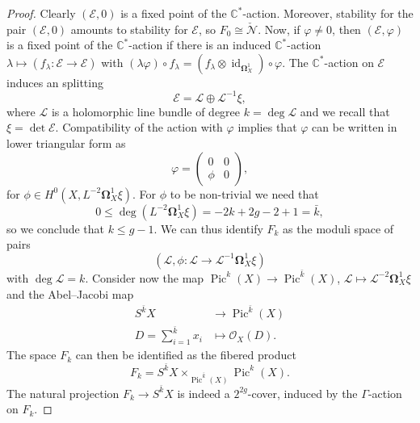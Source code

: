 \documentclass[12pt,a4paper]{amsbook}
\theoremstyle{remark} \newtheorem{rmk}[thm]{Remark}
\theoremstyle{definition} \newtheorem{defn}[thm]{Definition}
\theoremstyle{definition} \newtheorem{ex}[thm]{Example}
\theoremstyle{definition} \newtheorem{ej}{Exercise}
\newcommand{\C}{\mathbb C}
\newcommand{\cN}{\mathcal N}
\newcommand{\sO}{\mathscr O}
\newcommand{\sE}{\mathscr E}
\newcommand{\sL}{\mathscr L}
\DeclareMathOperator{\Pic}{Pic}
\DeclareMathOperator{\id}{id}
\begin{document}
\begin{proof}
  Clearly $(\sE,0)$ is a fixed point of the $\C^*$-action. Moreover, stability for the pair $(\sE,0)$ amounts to stability for $\sE$, so $F_0\cong \check{\cN}$. Now, if $\varphi \neq 0$, then $(\sE,\varphi)$ is a fixed point of the $\C^*$-action if there is an induced $\C^*$-action $\lambda \mapsto (f_\lambda: \sE \rightarrow \sE)$ with $(\lambda \varphi) \circ f_\lambda = (f_\lambda \otimes \id_{\bm{\Omega}^1_X}) \circ \varphi$. The $\C^*$-action on $\sE$ induces an splitting
  \begin{equation*}
\sE = \sL \oplus \sL^{-1} \xi,
  \end{equation*}
  where $\sL$ is a holomorphic line bundle of degree $k=\deg \sL$ and we recall that $\xi=\det \sE$. Compatibility of the action with $\varphi$ implies that $\varphi$ can be written in lower triangular form as
  \begin{equation*}
    \varphi =
    \begin{pmatrix}
      0 & 0 \\
      \phi & 0
    \end{pmatrix},
  \end{equation*}
  for $\phi \in H^0(X,L^{-2}\bm{\Omega}^1_X \xi)$. For $\phi$ to be non-trivial we need that
  \begin{equation*}
0 \leq \deg (L^{-2}\bm{\Omega}^1_X \xi) =-2k + 2g-2 + 1= \bar{k},
  \end{equation*}
  so we conclude that $k \leq g -1$. We can thus identify $F_k$ as the moduli space of pairs
  \begin{equation*}
(\sL,\phi: \sL \rightarrow \sL^{-1} \bm{\Omega}^1_X \xi)
  \end{equation*}
  with $\deg \sL = k$. Consider now the map $\Pic^{k}(X)\rightarrow \Pic^{\bar{k}}(X)$, $\sL \mapsto \sL^{-2} \bm{\Omega}^1_X \xi$ and the Abel--Jacobi map
  \begin{align*}
    S^{\bar{k}} X & \longrightarrow  \Pic^{\bar{k}}(X) \\
    D=\sum_{i=1}^{\bar{k}} x_i  & \longmapsto \sO_X(D).
  \end{align*}
The space $F_k$ can then be identified as the fibered product
\begin{equation*}
F_k = S^{\bar{k}} X \times_{\Pic^{\bar{k}}(X)} \Pic^k(X).
\end{equation*}
The natural projection $F_k \rightarrow S^{\bar{k}} X$ is indeed a $2^{2g}$-cover, induced by the $\Gamma$-action on $F_k$.
\end{proof}
\end{document}
